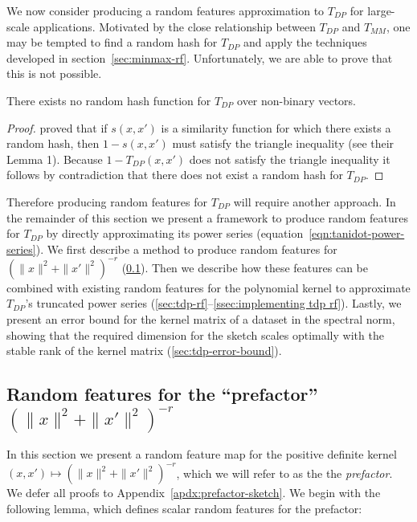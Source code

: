 We now consider producing a random features approximation to $T_{DP}$ for large-scale applications.
Motivated by the close relationship between $T_{DP}$ and $T_{MM}$,
one may be tempted to find a random hash for $T_{DP}$
and apply the techniques developed in section~\ref{sec:minmax-rf}.
Unfortunately, we are able to prove that this is not possible.
\begin{proposition}\label{no random hash for tdp}
    There exists no random hash function for $T_{DP}$ over non-binary vectors.
\end{proposition}
\begin{proof}
    \citet{charikar2002similarity} proved that if $s(x,x')$ is a similarity function
    for which there exists a random hash,
    then $1-s(x,x')$ must satisfy the triangle inequality (see their Lemma 1).
    Because $1-T_{DP}(x,x')$ does not satisfy the triangle inequality it follows by contradiction
    that there does not exist a random hash for $T_{DP}$.
\end{proof}

Therefore producing random features for $T_{DP}$ will require another approach.
In the remainder of this section we present a framework to produce random features for $T_{DP}$ by directly approximating its power series
(equation~\ref{eqn:tanidot-power-series}).
We first describe a method to produce random features for $(\|x\|^2+\|x'\|^2)^{-r}$ (\ref{ssec:prefactor-rf}).
Then we describe how these features can be combined with existing random features for the polynomial kernel
to approximate $T_{DP}$'s truncated power series (\ref{sec:tdp-rf}--\ref{ssec:implementing tdp rf}).
Lastly, we present an error bound for the kernel matrix of a dataset in the spectral norm,
showing that the required dimension for the sketch scales optimally with the stable rank of the kernel matrix
(\ref{sec:tdp-error-bound}).


\subsection{Random features for the ``prefactor'' $\left(\|x\|^2+\|x'\|^2\right)^{-r}$}\label{ssec:prefactor-rf}

In this section we present a random feature map for the positive definite kernel $\textstyle (x,x')\mapsto (\|x\|^2 + \|x'\|^2)^{-r}$,
which we will refer to as the the \emph{prefactor}.
We defer all proofs to Appendix~\ref{apdx:prefactor-sketch}.
We begin with the following lemma, which defines scalar random features for the prefactor:

